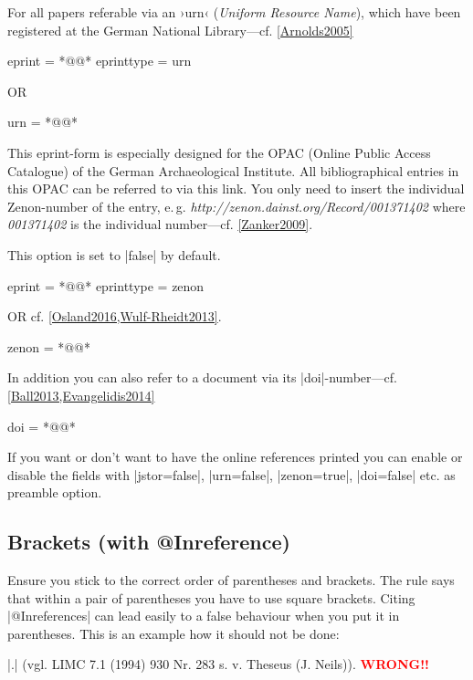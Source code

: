 \documentclass[a4paper,
10pt,
greek,
french,
spanish,
italian,
ngerman,
english
]{ltxdoc}
\begin{document}
For all papers referable via an ›urn‹ (\emph{Uniform Resource Name}), which have been registered at the German National Library---cf. \cref{Arnolds2005}
\begin{code}
eprint = *@@*
eprinttype = {urn} 
\end{code}      

OR
\begin{code}
urn = *@@*
\end{code}  

This eprint-form is especially designed for the OPAC (Online Public Access Catalogue) of the German Archaeological Institute.
All bibliographical entries in this OPAC can be referred to via this link.
You only need to insert the individual Zenon-number of the entry, e.\,g. \emph{http://zenon.dainst.org/Record/001371402} where \emph{001371402} is the individual number---cf. \cref{Zanker2009}.

This option is set to |false| by default.
\begin{code}
eprint = *@@*
eprinttype = {zenon} 
\end{code}      
OR  cf. \cref{Osland2016,Wulf-Rheidt2013}.
\begin{code}
zenon = *@@*
\end{code}      


 In addition you can also refer to a document via its |doi|-number---cf. \cref{Ball2013,Evangelidis2014} 
\begin{code}
doi = *@@*
\end{code}  

If you want or don’t want to have the online references printed you can enable or disable the fields with |jstor=false|, 
|urn=false|,
|zenon=true|,
|doi=false| etc. as preamble option.

\subsection{Brackets (with @Inreference)}\label{faq:inreference}
Ensure you stick to the correct order of parentheses and brackets.
The rule says that within a pair of parentheses you have to use square brackets.
Citing |@Inreferences| can lead easily to a false behaviour when you put it in parentheses.
This is an example how it should not be done:
\begin{tcolorbox}[examplebox]
|\cite[vgl.][930 Nr. 283]{Neils1994}.| 
\tcblower
(vgl. LIMC 7.1 (1994) 930 Nr. 283 s. v. Theseus (J. Neils)). \textcolor{red}{\textbf{WRONG!!}}
\end{tcolorbox}
 
\end{document}
